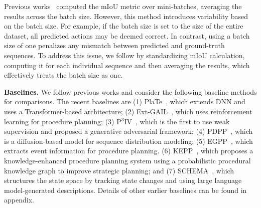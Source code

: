 Previous works~\citep{chang2020procedure, bi2021procedure, sun2022plate} computed the mIoU metric over mini-batches, averaging the results across the batch size. However, this method introduces variability based on the batch size. For example, if the batch size is set to the size of the entire dataset, all predicted actions may be deemed correct. In contrast, using a batch size of one penalizes any mismatch between predicted and ground-truth sequences. To address this issue, we follow \citet{wang2023pdpp} by standardizing mIoU calculation, computing it for each individual sequence and then averaging the results, which effectively treats the batch size as one.

\textbf{Baselines.} We follow previous works and consider the following baseline methods for comparisons. The recent baselines are (1) PlaTe~\cite{sun2022plate}, which extends DNN and uses a Transformer-based architecture; (2) Ext-GAIL~\cite{bi2021procedure}, which uses reinforcement learning for procedure planning; (3) P$^3$IV~\cite{zhao2022p3iv}, which is the first to use weak supervision and proposed a generative adversarial framework; (4) PDPP~\cite{wang2023pdpp}, which is a diffusion-based model for sequence distribution modeling; (5) EGPP~\cite{wang2023event}, which extracts event information for procedure planning. (6) KEPP~\cite{nagasinghe2024not}, which proposes a knowledge-enhanced procedure planning system using a probabilistic procedural knowledge graph to improve strategic planning; and (7) SCHEMA~\cite{niu2024schema}, which structures the state space by tracking state changes and using large language model-generated descriptions. Details of other earlier baselines can be found in appendix.
